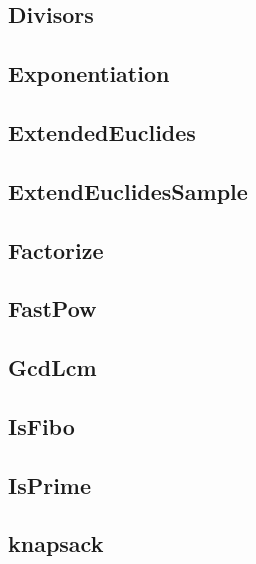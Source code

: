 \subsection{ Divisors}
\raggedbottom
\hrulefill
\subsection{ Exponentiation}
\raggedbottom
\hrulefill
\subsection{ ExtendedEuclides}
\raggedbottom
\hrulefill
\subsection{ ExtendEuclidesSample}
\raggedbottom
\hrulefill
\subsection{ Factorize}
\raggedbottom
\hrulefill
\subsection{ FastPow}
\raggedbottom
\hrulefill
\subsection{ GcdLcm}
\raggedbottom
\hrulefill
\subsection{ IsFibo}
\raggedbottom
\hrulefill
\subsection{ IsPrime}
\raggedbottom
\hrulefill
\subsection{ knapsack}
\raggedbottom
\hrulefill
